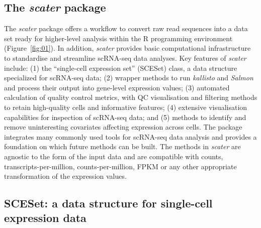 \documentclass[10pt,letterpaper]{article}
\begin{document}
\subsection*{The \emph{scater} package}\label{the-scater-package}

The \emph{scater} package offers a workflow to convert raw read sequences into a data set ready for higher-level analysis within the R programming environment (Figure~\ref{fig:01}). In addition, \emph{scater} provides basic computational infrastructure to standardise and streamline scRNA-seq data analyses. Key features of \emph{scater} include: (1) the ``single-cell expression set'' (SCESet) class, a data structure specialized for scRNA-seq data; (2) wrapper methods to run \emph{kallisto} and \emph{Salmon} and process their output into gene-level expression values; (3) automated calculation of quality control metrics, with QC visualisation and filtering methods to retain high-quality cells and informative features; (4) extensive visualisation capabilities for inspection of scRNA-seq data; and (5) methods to identify and remove uninteresting covariates affecting expression across cells. The package integrates many commonly used tools for scRNA-seq data analysis and provides a foundation on which future methods can be built. The methods in \emph{scater} are agnostic to the form of the input data and are compatible with counts, transcripts-per-million, counts-per-million, FPKM or any other appropriate transformation of the expression values.


\subsection*{SCESet: a data structure for single-cell expression
data}\label{sceset-a-data-structure-for-single-cell-expression-data}
\end{document}
